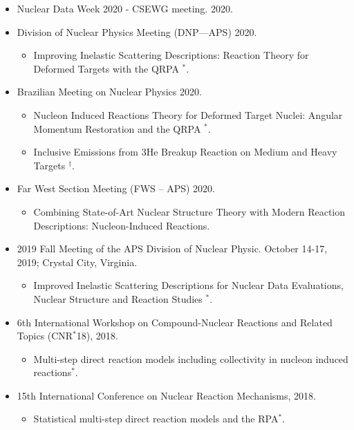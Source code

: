 \documentclass[12pt,a4paper,sans]{moderncv}
\begin{document}
{
  \begin{itemize}
  \item Nuclear Data Week 2020 - CSEWG meeting. 2020.   
  \item Division of Nuclear Physics Meeting (DNP—APS) 2020.
    \begin{itemize}
      \item Improving Inelastic Scattering Descriptions: Reaction Theory for Deformed Targets with the QRPA $^{*}$.
      \end{itemize}
    \item Brazilian Meeting on Nuclear Physics 2020.
      \begin{itemize}
        \item Nucleon Induced Reactions Theory for Deformed Target Nuclei: Angular Momentum Restoration and the QRPA $^{*}$.
 \item Inclusive Emissions from 3He Breakup Reaction on Medium and Heavy Targets $^{\dagger}$.
        \end{itemize}
    \item  Far West Section Meeting (FWS – APS) 2020.
      \begin{itemize}
        \item  Combining State-of-Art Nuclear Structure Theory with Modern
Reaction Descriptions: Nucleon-Induced Reactions.
        \end{itemize}
    \item  2019 Fall Meeting of the APS Division of Nuclear Physic. October 14-17, 2019; Crystal City, Virginia.
    \begin{itemize}
      \item Improved Inelastic Scattering Descriptions for Nuclear Data Evaluations, Nuclear Structure and Reaction Studies $^{*}$.
      \end{itemize}
  \item 6th  International Workshop on Compound-Nuclear Reactions and Related Topics (CNR$^{*}$18), 2018.
     \begin{itemize}
      \item Multi-step direct reaction models including collectivity in nucleon induced reactions$^{*}$.
     \end{itemize}
  \item 15th International Conference on Nuclear Reaction Mechanisms, 2018.
     \begin{itemize}
      \item Statistical multi-step direct reaction models and the RPA$^{*}$.

\end{itemize}
\end{itemize}}
\end{document}
